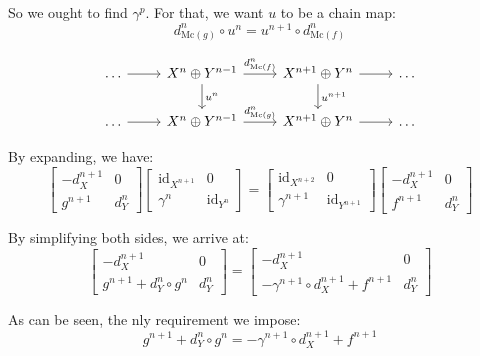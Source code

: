 \documentclass{category-template}
\begin{document}
So we ought to find $\gamma^p$. For that, we want $u$ to be a chain map:
\begin{equation*}
    d_{\text{Mc}(g)}^n \circ u^n = u^{n+1} \circ d_{\text{Mc}(f)}^n
\end{equation*}

\[
\begin{tikzcd}
	\dots \arrow{r}{} & {X^n \oplus Y^{n-1}} \arrow{r}{d_{\text{Mc}(f)}^n} \arrow{d}{u^n} & {X^{n+1} \oplus Y^n} \arrow{r}{} \arrow{d}{u^{n+1}} & \dots \\
	\dots \arrow{r}{} & {X^{n} \oplus Y^{n-1}} \arrow{r}{d_{\text{Mc}(g)}^n} & {X^{n+1} \oplus Y^n} \arrow{r}{} & \dots
\end{tikzcd}
\]

By expanding, we have:
\begin{equation*}
    \begin{bmatrix}
        -d_X^{n+1} & 0 \\
        g^{n+1} & d_Y^n
    \end{bmatrix}\begin{bmatrix}
        \text{id}_{X^{n+1}} & 0 \\
        \gamma^n & \text{id}_{Y^{n}}
    \end{bmatrix} = \begin{bmatrix}
        \text{id}_{X^{n+2}} & 0 \\
        \gamma^{n+1} & \text{id}_{Y^{n+1}}
    \end{bmatrix}\begin{bmatrix}
        -d_X^{n+1} & 0 \\
        f^{n+1} & d_Y^n
    \end{bmatrix}
\end{equation*}

By simplifying both sides, we arrive at:
\begin{equation*}
    \begin{bmatrix}
        -d_X^{n+1} & 0 \\
        g^{n+1} + d_Y^n \circ g^{n} & d_Y^n
    \end{bmatrix} = \begin{bmatrix}
        -d_X^{n+1} & 0 \\
        -\gamma^{n+1} \circ d_X^{n+1} + f^{n+1} & d_Y^n
    \end{bmatrix}
\end{equation*}

As can be seen, the nly requirement we impose:
\begin{equation*}
    g^{n+1} + d_Y^n \circ g^{n} = -\gamma^{n+1} \circ d_X^{n+1} + f^{n+1}
\end{equation*}
\end{document}
